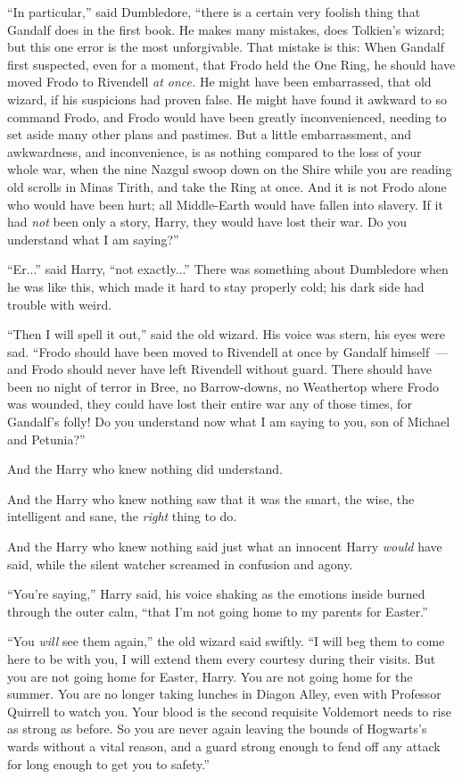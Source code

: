 ``In particular,'' said Dumbledore, ``there is a certain very foolish thing that Gandalf does in the first book. He makes many mistakes, does Tolkien's wizard; but this one error is the most unforgivable. That mistake is this: When Gandalf first suspected, even for a moment, that Frodo held the One Ring, he should have moved Frodo to Rivendell \emph{at once.} He might have been embarrassed, that old wizard, if his suspicions had proven false. He might have found it awkward to so command Frodo, and Frodo would have been greatly inconvenienced, needing to set aside many other plans and pastimes. But a little embarrassment, and awkwardness, and inconvenience, is as nothing compared to the loss of your whole war, when the nine Nazgul swoop down on the Shire while you are reading old scrolls in Minas Tirith, and take the Ring at once. And it is not Frodo alone who would have been hurt; all Middle-Earth would have fallen into slavery. If it had \emph{not} been only a story, Harry, they would have lost their war. Do you understand what I am saying?''

``Er...'' said Harry, ``not exactly...'' There was something about Dumbledore when he was like this, which made it hard to stay properly cold; his dark side had trouble with weird.

``Then I will spell it out,'' said the old wizard. His voice was stern, his eyes were sad. ``Frodo should have been moved to Rivendell at once by Gandalf himself~--- and Frodo should never have left Rivendell without guard. There should have been no night of terror in Bree, no Barrow-downs, no Weathertop where Frodo was wounded, they could have lost their entire war any of those times, for Gandalf's folly! Do you understand now what I am saying to you, son of Michael and Petunia?''

And the Harry who knew nothing did understand.

And the Harry who knew nothing saw that it was the smart, the wise, the intelligent and sane, the \emph{right} thing to do.

And the Harry who knew nothing said just what an innocent Harry \emph{would} have said, while the silent watcher screamed in confusion and agony.

``You're saying,'' Harry said, his voice shaking as the emotions inside burned through the outer calm, ``that I'm not going home to my parents for Easter.''

``You \emph{will} see them again,'' the old wizard said swiftly. ``I will beg them to come here to be with you, I will extend them every courtesy during their visits. But you are not going home for Easter, Harry. You are not going home for the summer. You are no longer taking lunches in Diagon Alley, even with Professor Quirrell to watch you. Your blood is the second requisite Voldemort needs to rise as strong as before. So you are never again leaving the bounds of Hogwarts's wards without a vital reason, and a guard strong enough to fend off any attack for long enough to get you to safety.''

